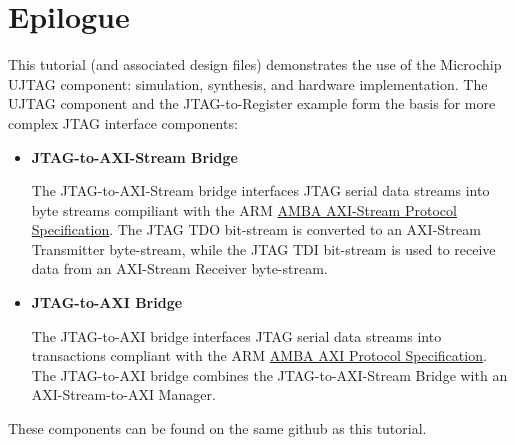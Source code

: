 \section{Epilogue}
\label{sec:epilogue}

This tutorial (and associated design files) demonstrates the use of the
Microchip UJTAG component: simulation, synthesis, and hardware
implementation.
%
The UJTAG component and the JTAG-to-Register example form the basis
for more complex JTAG interface components:
%
\begin{itemize}
\item \textbf{JTAG-to-AXI-Stream Bridge}

The JTAG-to-AXI-Stream bridge interfaces JTAG serial data streams into
byte streams compiliant with the ARM
\href{https://developer.arm.com/documentation/ihi0051/latest}
{AMBA AXI-Stream Protocol Specification}.
%
The JTAG TDO bit-stream is converted to an AXI-Stream Transmitter
byte-stream, while the JTAG TDI bit-stream is used to receive data
from an AXI-Stream Receiver byte-stream.

\item \textbf{JTAG-to-AXI Bridge}

The JTAG-to-AXI bridge interfaces JTAG serial data streams into transactions
compliant with the ARM
\href{https://developer.arm.com/documentation/ihi0022/latest}
{AMBA AXI Protocol Specification}.
%
The JTAG-to-AXI bridge combines the JTAG-to-AXI-Stream Bridge with an
AXI-Stream-to-AXI Manager.

\end{itemize}
%
These components can be found on the same github as this tutorial.

